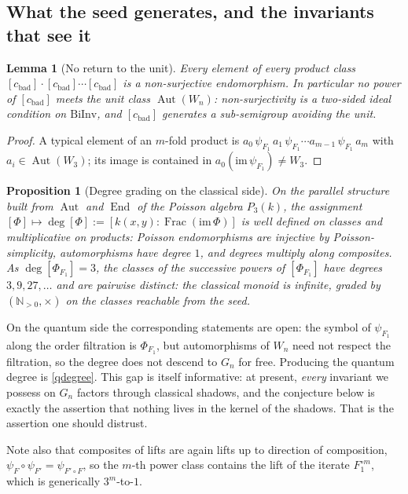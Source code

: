 \documentclass[11pt]{article}
\theoremstyle{change}
\newtheorem{prop}[equation]{Proposition}
\newtheorem{lemma}[equation]{Lemma}
\theoremstyle{nonumberplain}
\newtheorem{proof}{Proof}
\numberwithin{equation}{section}
\newcommand\NN{{\mathbb N}}
\DeclareMathOperator{\End}{End}
\DeclareMathOperator{\Aut}{Aut}
\DeclareMathOperator{\Frac}{Frac}
\begin{document}
\subsection{What the seed generates, and the invariants that see it\label{invariants}}

\begin{lemma}[No return to the unit\label{noreturn}]
Every element of every product class $[c_{\text{bad}}] \cdot [c_{\text{bad}}] \cdots [c_{\text{bad}}]$ is a non-surjective endomorphism. In particular no power of $[c_{\text{bad}}]$ meets the unit class $\Aut(W_n)$: non-surjectivity is a two-sided ideal condition on $\text{BiInv}$, and $[c_{\text{bad}}]$ generates a sub-semigroup avoiding the unit.
\end{lemma}

\begin{proof}
A typical element of an $m$-fold product is $a_0 \, \psi_{F_1} \, a_1 \, \psi_{F_1} \cdots a_{m-1} \, \psi_{F_1} \, a_m$ with $a_i \in \Aut(W_3)$; its image is contained in $a_0(\text{im}\, \psi_{F_1}) \neq W_3$.
\end{proof}

\begin{prop}[Degree grading on the classical side\label{degree}]
On the parallel structure built from $\Aut$ and $\End$ of the Poisson algebra $P_3(k)$, the assignment $[\Phi] \mapsto \deg[\Phi] := [k(x,y) : \Frac(\text{im}\, \Phi)]$ is well defined on classes and multiplicative on products: Poisson endomorphisms are injective by Poisson-simplicity, automorphisms have degree $1$, and degrees multiply along composites. As $\deg[\Phi_{F_1}] = 3$, the classes of the successive powers of $[\Phi_{F_1}]$ have degrees $3, 9, 27, \dots$ and are pairwise distinct: the classical monoid is infinite, graded by $(\NN_{>0}, \times)$ on the classes reachable from the seed.
\end{prop}

On the quantum side the corresponding statements are open: the symbol of $\psi_{F_1}$ along the order filtration is $\Phi_{F_1}$, but automorphisms of $W_n$ need not respect the filtration, so the degree does not descend to $G_n$ for free. Producing the quantum degree is \cref{qdegree}. This gap is itself informative: at present, \emph{every} invariant we possess on $G_n$ factors through classical shadows, and the conjecture below is exactly the assertion that nothing lives in the kernel of the shadows. That is the assertion one should distrust.

Note also that composites of lifts are again lifts up to direction of composition, $\psi_F \circ \psi_{F'} = \psi_{F' \circ F}$, so the $m$-th power class contains the lift of the iterate $F_1^{\circ m}$, which is generically $3^m$-to-$1$.
\end{document}
